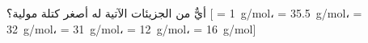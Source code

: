 \begin{question}\begin{instance}    \begin{mcq}[standalone=false]      \begin{stem}        أيٌّ من الجزيئات الآتية له أصغر كتلة مولية؟ [ = 1\ \textrm{g}/\textrm{mol}،  = 35.5\ \textrm{g}/\textrm{mol}،  = 32\ \textrm{g}/\textrm{mol}،  = 31\ \textrm{g}/\textrm{mol}،  = 12\ \textrm{g}/\textrm{mol}،  = 16\ \textrm{g}/\textrm{mol}]\par      \end{stem}      \begin{distractors}\end{distractors}                            \end{mcq}  \end{instance}\end{question}